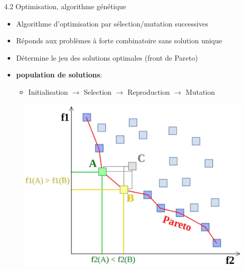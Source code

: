 \begin{frame}{4.2 Optimisation, algorithme génétique}
  \begin{itemize}
  \item Algorithme d'optimisation par sélection/mutation successives
  \item Réponds aux problèmes à forte combinatoire sans solution unique
  \item Détermine le jeu des solutions optimales (front de Pareto)
  \end{itemize}
  \begin{minipage}{.65\textwidth}
    \begin{itemize}
    \item \textcolor{orangeAgaetis}{\textbf{population de solutions}}:
      \begin{itemize}
      \item \textcolor{orangeAgaetis}{Initialisation $\rightarrow$ Selection $\rightarrow$ Reproduction $\rightarrow$ Mutation}
      \end{itemize}
    \end{itemize}
    \vfill
    \hspace{0.25\textwidth}
    \begin{minipage}{0.5\textwidth}
      \begin{figure}
        \includegraphics[width=\textwidth]{figs/Front_pareto.png}
      \end{figure}
    \end{minipage}
  \end{minipage}
  \begin{minipage}{.3\textwidth}
    \begin{figure}

\end{figure}
\end{minipage}
\end{frame}
